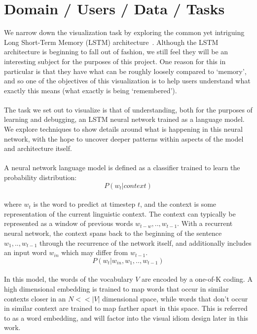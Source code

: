 \documentclass[journal]{vgtc}                %
\begin{document}
\section{Domain / Users / Data / Tasks}
We narrow down the visualization task by exploring the common yet intriguing Long Short-Term Memory (LSTM) architecture~\cite{lstm}.
Although the LSTM architecture is beginning to fall out of fashion, we still feel they will be an interesting subject for the purposes of this project.
One reason for this in particular is that they have what can be roughly loosely compared to `memory', and so one of the objectives of this visualization is to help users understand what exactly this means (what exactly is being `remembered').
\\
\\
The task we set out to visualize is that of understanding, both for the purposes of learning and debugging, an LSTM neural network trained as a language model.
We explore techniques to show details around what is happening in this neural network, with the hope to uncover deeper patterns within aspects of the model and architecture itself.
\\
\\
A neural network language model is defined as a classifier trained to learn the probability distribution:
\begin{equation}
    P(w_t|context)
\end{equation}
\\
where $w_t$ is the word to predict at timestep $t$, and the context is some representation of the current linguistic context.
The context can typically be represented as a window of previous words $w_{t-w},..,w_{t-1}$.
With a recurrent neural network, the context spans back to the beginning of the sentence $w_1,..,w_{t-1}$ through the recurrence of the network itself, and additionally includes an input word $w_{in}$ which may differ from $w_{t-1}$.
\begin{equation}
    P(w_t|w_{in},w_1,..,w_{t-1})
\end{equation}
\\
In this model, the words of the vocabulary $V$ are encoded by a one-of-K coding.
A high dimensional embedding is trained to map words that occur in similar contexts closer in an $N << |V|$ dimensional space, while words that don't occur in similar context are trained to map farther apart in this space.
This is referred to as a word embedding, and will factor into the visual idiom design later in this work.
\\
\end{document}
